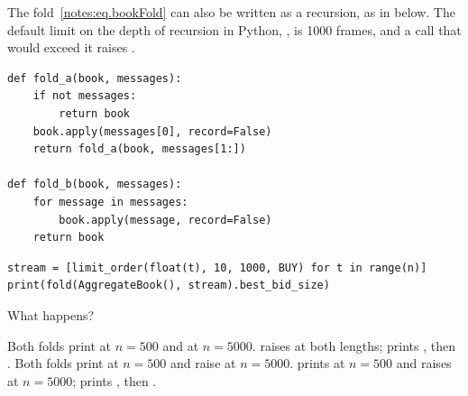 \begin{question}
\label{question.recursiveFoldOverAStream}
The fold~\eqref{notes:eq.bookFold} can also be written as a recursion,
as in  below.
The default limit on the depth of recursion in Python,
, is 1000 frames,
and a call that would exceed it raises .
\begin{lstlisting}[caption={A recursive fold and a loop}, label=listing.recursiveFoldOverAStreamFolds]
def fold_a(book, messages):
    if not messages:
        return book
    book.apply(messages[0], record=False)
    return fold_a(book, messages[1:])

def fold_b(book, messages):
    for message in messages:
        book.apply(message, record=False)
    return book
\end{lstlisting}
\begin{lstlisting}[caption={Run with each fold, for $n = 500$ and for $n = 5000$}, label=listing.recursiveFoldOverAStreamRun]
stream = [limit_order(float(t), 10, 1000, BUY) for t in range(n)]
print(fold(AggregateBook(), stream).best_bid_size)
\end{lstlisting}
What happens?
\begin{choices}
 \choice Both folds print  at $n = 500$ and  at $n = 5000$.
 \choice {} raises  at both lengths;
   prints , then .
 \choice Both folds print  at $n = 500$
  and raise  at $n = 5000$.
 \correctchoice {} prints  at $n = 500$
  and raises  at $n = 5000$;
   prints , then .
\end{choices}
\end{question}

